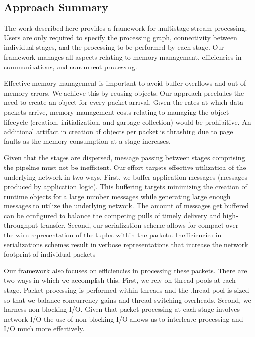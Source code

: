 \subsection{Approach Summary}

The work described here provides a framework for multistage stream processing. Users are only required to specify the processing graph, connectivity between individual stages, and the processing to be performed by each stage. Our framework manages all aspects relating to memory management, efficiencies in communications, and concurrent processing.

Effective memory management is important to avoid buffer overflows and out-of-memory errors. We achieve this by reusing objects. Our approach precludes the need to create an object for every packet arrival. Given the rates at which data packets arrive, memory management costs relating to managing the object lifecycle (creation, initialization, and garbage collection) would be prohibitive. An additional artifact in creation of objects per packet is thrashing due to page faults as the memory consumption at a stage increases.  

Given that the stages are dispersed, message passing between stages comprising the pipeline must not be inefficient. Our effort targets effective utilization of the underlying network in two ways. First, we buffer application messages (messages produced by application logic). This buffering targets minimizing the creation of runtime objects for a large number messages while generating large enough messages to utilize the underlying network. The amount of messages get buffered can be configured to balance the competing pulls of timely delivery and high-throughput transfer. Second, our serialization scheme allows for compact over-the-wire representation of the tuples within the packets. Inefficiencies in serializations schemes result in verbose representations that increase the network footprint of individual packets.

Our framework also focuses on efficiencies in processing these packets. There are two ways in which we accomplish this. First, we rely on thread pools at each stage. Packet processing is performed within threads and the thread-pool is sized so that we balance concurrency gains and thread-switching overheads. Second, we harness non-blocking I/O. Given that packet processing at each stage involves network I/O the use of non-blocking I/O allows us to interleave processing and I/O much more effectively. 

